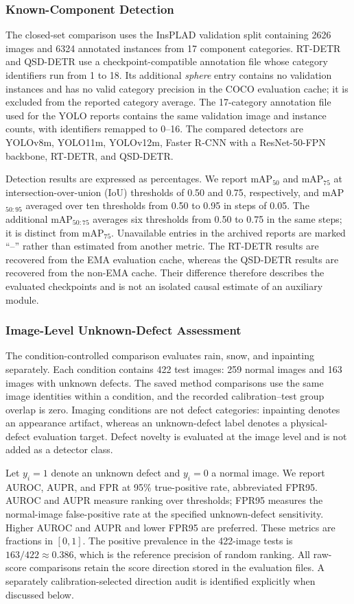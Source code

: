 \subsubsection{Known-Component Detection}
The closed-set comparison uses the InsPLAD validation split containing
2626 images and 6324 annotated instances from 17 component categories.
RT-DETR and QSD-DETR use a checkpoint-compatible annotation file whose
category identifiers run from 1 to 18. Its additional \emph{sphere} entry
contains no validation instances and has no valid category precision in the
COCO evaluation cache; it is excluded from the reported category average.
The 17-category annotation file used for the YOLO reports contains the same
validation image and instance counts, with identifiers remapped to 0--16.
The compared detectors are YOLOv8m, YOLO11m, YOLOv12m, Faster R-CNN with a
ResNet-50-FPN backbone, RT-DETR, and QSD-DETR.

Detection results are expressed as percentages. We report mAP$_{50}$ and
mAP$_{75}$ at intersection-over-union (IoU) thresholds of 0.50 and 0.75,
respectively, and mAP$_{50:95}$ averaged over ten thresholds from 0.50 to
0.95 in steps of 0.05. The additional mAP$_{50:75}$ averages six thresholds
from 0.50 to 0.75 in the same steps; it is distinct from mAP$_{75}$.
Unavailable entries in the archived reports are marked ``--'' rather than
estimated from another metric. The RT-DETR results are recovered from the
EMA evaluation cache, whereas the QSD-DETR results are recovered from the
non-EMA cache. Their difference therefore describes the evaluated
checkpoints and is not an isolated causal estimate of an auxiliary module.

\subsubsection{Image-Level Unknown-Defect Assessment}
The condition-controlled comparison evaluates rain, snow, and inpainting
separately. Each condition contains 422 test images: 259 normal images and
163 images with unknown defects. The saved method comparisons use the same
image identities within a condition, and the recorded calibration--test
group overlap is zero. Imaging conditions are not defect categories:
inpainting denotes an appearance artifact, whereas an unknown-defect label
denotes a physical-defect evaluation target. Defect novelty is evaluated
at the image level and is not added as a detector class.

Let $y_i=1$ denote an unknown defect and $y_i=0$ a normal image. We report
AUROC, AUPR, and FPR at 95\% true-positive rate, abbreviated FPR95. AUROC
and AUPR measure ranking over thresholds; FPR95 measures the normal-image
false-positive rate at the specified unknown-defect sensitivity. Higher
AUROC and AUPR and lower FPR95 are preferred. These metrics are fractions
in $[0,1]$. The positive prevalence in the 422-image tests is
$163/422\approx0.386$, which is the reference precision of random ranking.
All raw-score comparisons retain the score direction stored in the
evaluation files. A separately calibration-selected direction audit is
identified explicitly when discussed below.

